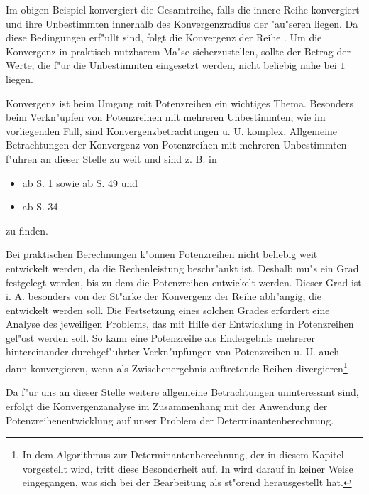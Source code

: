 Im obigen Beispiel konvergiert die Gesamtreihe, falls die innere
Reihe konvergiert und ihre Unbestimmten innerhalb des Konvergenzradius
der "au"seren liegen. Da diese Bedingungen erf"ullt sind, folgt die
Konvergenz der Reihe . Um die Konvergenz
in praktisch nutzbarem Ma"se sicherzustellen, sollte der Betrag der Werte,
die f"ur die Unbestimmten eingesetzt werden, nicht beliebig nahe bei $1$
liegen.

Konvergenz ist beim Umgang mit Potenzreihen ein wichtiges Thema. 
Besonders beim Ver\-kn"u\-pfen von Potenzreihen mit mehreren 
Unbestimmten, wie
im vorliegenden Fall, sind Konvergenzbetrachtungen u. U. komplex.
Allgemeine Betrachtungen der Konvergenz von Potenzreihen mit mehreren
Unbestimmten f"uhren an dieser Stelle zu weit und sind z. B. in
\begin{itemize}
\item
      \cite{BT70} ab S. 1 sowie ab S. 49 \hspace{2em} und
\item
      \cite{Hoer73} ab S. 34 
\end{itemize}
zu finden.

Bei praktischen Berechnungen k"onnen Potenzreihen nicht beliebig weit
entwickelt werden, da die Rechenleistung beschr"ankt ist. Deshalb mu"s
ein Grad festgelegt werden, bis zu dem die Potenzreihen entwickelt werden.
Dieser Grad ist i. A. besonders von der St"arke der Konvergenz der Reihe
abh"angig, die entwickelt werden soll. Die Festsetzung eines solchen
Grades erfordert eine Analyse des jeweiligen Problems, das mit Hilfe der
Entwicklung in Potenzreihen gel"ost werden soll. So kann eine Potenzreihe
als Endergebnis mehrerer hintereinander durchgef"uhrter Verkn"upfungen von
Potenzreihen u. U. auch dann konvergieren, wenn als Zwischenergebnis
auftretende Reihen divergieren\footnote{In dem Algorithmus zur
Determinantenberechnung, der in diesem Kapitel vorgestellt wird,
tritt diese Besonderheit auf. In \cite{BGH82} wird darauf in keiner Weise
eingegangen, was sich bei der Bearbeitung als st"orend herausgestellt
hat. }

Da f"ur uns an dieser Stelle weitere allgemeine Betrachtungen uninteressant 
sind, erfolgt die Konvergenzanalyse im Zusammenhang mit der Anwendung 
der Potenzreihenentwicklung auf unser Problem der Determinantenberechnung.



